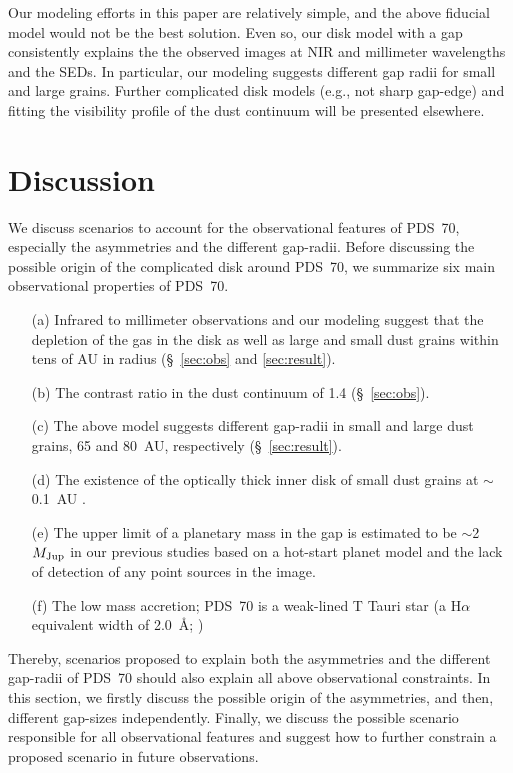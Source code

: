 \documentclass[apj]{emulateapj-rtx4}
\begin{document}
    Our modeling efforts in this paper are relatively simple, and the above fiducial model would not be 
    the best solution.
      Even so, our disk model with a gap consistently explains the the observed images at NIR and millimeter
      wavelengths and the SEDs. In particular, our modeling suggests different gap radii for small and large grains.
    Further complicated disk models (e.g., not sharp gap-edge) and fitting the visibility profile of the dust continuum 
    will be presented elsewhere. 

  \section{Discussion}\label{sec:discuss} 

  We discuss scenarios to account for the observational features of PDS~70, especially the asymmetries and the different 
  gap-radii. Before discussing the possible origin of the complicated disk around PDS~70, we summarize six main observational 
  properties of PDS~70.
  \begin{itemize}
  \item[(a)] Infrared to millimeter observations and our modeling suggest that 
    the depletion of the gas in the disk as well as large and small dust grains within tens of AU in radius 
    (\S~\ref{sec:obs} and \ref{sec:result}).
  \item[(b)] The contrast ratio in the dust continuum of 1.4 (\S~\ref{sec:obs}).
  \item[(c)] The above model suggests 
    different gap-radii in small and large dust grains, 65 and 80~AU, respectively (\S~\ref{sec:result}). 
  \item[(d)] The existence of the optically thick inner disk of small dust grains at $\sim$0.1~AU \citep{hash12}.
  \item[(e)] 
    The upper limit of a planetary mass in the gap is estimated to be $\sim$2~$M_{\rm Jup}$ in our previous studies \citep{hash12}  
    based on a hot-start planet model \citep{bara03} and the lack of detection of any point sources in the image.
  \item[(f)] The low mass accretion; PDS~70 is a weak-lined T Tauri star (a H$\alpha$ equivalent width
  of 2.0~\AA; \citealt{greg02})
  \end{itemize}
  Thereby, scenarios proposed to explain both the asymmetries and the different gap-radii of PDS~70 should also explain 
  all above observational 
  constraints. In this section, we firstly discuss the possible origin of the asymmetries, and then, different gap-sizes independently. 
  Finally, we discuss the possible scenario responsible for all observational features and suggest how to 
  further constrain
  a proposed scenario in future observations. 
\end{document}
